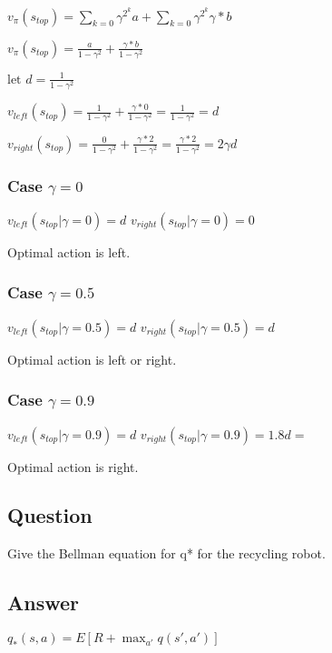 \documentclass[11pt]{article}
\begin{document}
    $ v_{\pi}(s_{top}) = \sum_{k=0} \gamma^{2^{k}}a + \sum_{k=0} \gamma^{2^{k}}\gamma*b $

    $ v_{\pi}(s_{top}) = \frac{a}{1-\gamma^{2}} + \frac{\gamma * b}{1-\gamma^{2}} $

    $ \text{let } d = \frac{1}{1-\gamma^{2}} $

    $ v_{left}(s_{top}) = \frac{1}{1-\gamma^{2}} + \frac{\gamma * 0}{1-\gamma^{2}} = \frac{1}{1-\gamma^{2}} = d $

    $ v_{right}(s_{top}) = \frac{0}{1-\gamma^{2}} + \frac{\gamma * 2}{1-\gamma^{2}} = \frac{\gamma * 2}{1-\gamma^{2}} = 2 \gamma d $

    \subsubsection*{Case $\gamma=0$}

    $ v_{left}(s_{top} | \gamma=0) = d $
    $ v_{right}(s_{top} | \gamma=0) = 0 $

    Optimal action is left.


    \subsubsection*{Case $\gamma=0.5$}

    $ v_{left}(s_{top} | \gamma=0.5) = d $
    $ v_{right}(s_{top} | \gamma=0.5) = d $

    Optimal action is left or right.

    \subsubsection*{Case $\gamma=0.9$}

    $ v_{left}(s_{top} | \gamma=0.9) = d $
    $ v_{right}(s_{top} | \gamma=0.9) = 1.8d =  $

    Optimal action is right.

    \subsection{Question}

    Give the Bellman equation for q* for the recycling robot.

    \subsection*{Answer}

    $ q_{*}(s, a) = E[R + \max_{a'} q(s',a') ] $
\end{document}
